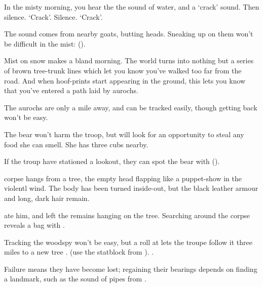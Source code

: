 
\ifcase\value{cycle}

\begin{boxtext}
  In the misty morning, you hear the the sound of water, and a `crack' sound.
  Then silence.
  `Crack'.
  Silence.
  `Crack'.
\end{boxtext}

The sound comes from nearby goats, butting heads.
Sneaking up on them won't be difficult in the mist:  (\tn[9]).

\or

\begin{boxtext}
  Mist on snow makes a bland morning.
  The world turns into nothing but a series of brown tree-trunk lines which let you know you've walked too far from the road.
  And when hoof-prints start appearing in the ground, this lets you know that you've entered a path laid by aurochs.
\end{boxtext}

The aurochs are only a mile away, and can be tracked easily, though getting back won't be easy.


\or

The bear won't harm the troop, but will look for an opportunity to steal any food she can smell.
She has three cubs nearby.

\setcounter{tn}{\value{Dexterity}}
\addtocounter{tn}{\value{Stealth}}

If the troup have stationed a lookout, they can spot the bear with  (\tn).

\bear

\else

\begin{boxtext}
   corpse hangs from a tree, the empty head flapping like a puppet-show in the violentl wind.
  The body has been turned inside-out, but the black leather armour and long, dark hair remain.
\end{boxtext}

 ate him, and left the remains hanging on the tree.
Searching around the corpse reveals a bag with \lootSmall.

Tracking the \gls{woodspy} won't  be easy, but a  roll at \tn[10] lets the troupe follow it three miles to a new tree%
%
  {%
      {.}%
      {(use the statblock from ).}%
  }{.
    \woodspy
  }

Failure means they have become lost; regaining their bearings depends on finding a landmark, such as the sound of pipes from .

\fi

